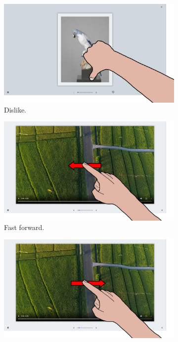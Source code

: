 \begin{figure}[ht]
    \begin{subfigure}{.24\textwidth}
        \centering
        \includegraphics[width=.97\linewidth]{Figures/LUI/Gestures/thumb_down.pdf}  
        \vspace{-6pt}
        \captionsetup{width=.9\linewidth}
        \caption{Dislike.}
        \label{fig:lui:gestures:dislike}
    \end{subfigure}
    \begin{subfigure}{.24\textwidth}
        \centering
        \includegraphics[width=.97\linewidth]{Figures/LUI/Gestures/swipe_left-seek.pdf}  
        \vspace{-6pt}
        \captionsetup{width=.9\linewidth}
        \caption{Fast forward.}
        \label{fig:lui:gestures:fast-forward}
    \end{subfigure}
    \begin{subfigure}{.24\textwidth}
        \centering
        \includegraphics[width=.97\linewidth]{Figures/LUI/Gestures/swipe_right-seek.pdf}  

\end{subfigure}
\end{figure}

